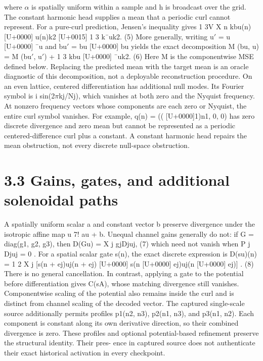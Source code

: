 \documentclass[11pt]{article}
\begin{document}
where \ensuremath{\alpha} is spatially uniform within a sample and h is broadcast over the grid. The constant
harmonic head supplies a mean that a periodic curl cannot represent. For a pure-curl prediction,
Jensen’s inequality gives
1
3V
X
n
kbu(n) [U+0000] u(n)k2 [U+0015] 1
3 k¯uk2. (5)
More generally, writing u\ensuremath{\prime} = u [U+0000] ¯u and bu\ensuremath{\prime} = bu [U+0000] bu yields the exact decomposition
M (bu, u) = M (bu\ensuremath{\prime}, u\ensuremath{\prime}) + 1
3 kbu [U+0000] ¯uk2. (6)
Here M is the componentwise MSE defined below. Replacing the predicted mean with the target
mean is an oracle diagnostic of this decomposition, not a deployable reconstruction procedure.
On an even lattice, centered differentiation has additional null modes. Its Fourier symbol is
i sin(2\ensuremath{\pi}kj/Nj), which vanishes at both zero and the Nyquist frequency. At nonzero frequency
vectors whose components are each zero or Nyquist, the entire curl symbol vanishes. For example,
q(n) = (( [U+0000]1)n1, 0, 0) has zero discrete divergence and zero mean but cannot be represented as
a periodic centered-difference curl plus a constant. A constant harmonic head repairs the mean
obstruction, not every discrete null-space obstruction.

\section*{3.3 Gains, gates, and additional solenoidal paths}

A spatially uniform scalar a and constant vector b preserve divergence under the isotropic affine
map u 7! au + b. Unequal channel gains generally do not: if G = diag(g1, g2, g3), then
D(Gu) =
X
j
gjDjuj, (7)
which need not vanish when P
j Djuj = 0 . For a spatial scalar gate s(n), the exact discrete
expression is
D(su)(n) = 1
2
X
j
[s(n + ej)uj(n + ej) [U+0000] s(n [U+0000] ej)uj(n [U+0000] ej)] . (8)
There is no general cancellation. In contrast, applying a gate to the potential before differentiation
gives C(sA), whose matching divergence still vanishes. Componentwise scaling of the potential also
remains inside the curl and is distinct from channel scaling of the decoded vector.
The captured single-scale source additionally permits profiles p1(n2, n3), p2(n1, n3), and p3(n1, n2).
Each component is constant along its own derivative direction, so their combined divergence is zero.
These profiles and optional potential-based refinement preserve the structural identity. Their pres-
ence in captured source does not authenticate their exact historical activation in every checkpoint.
\end{document}
